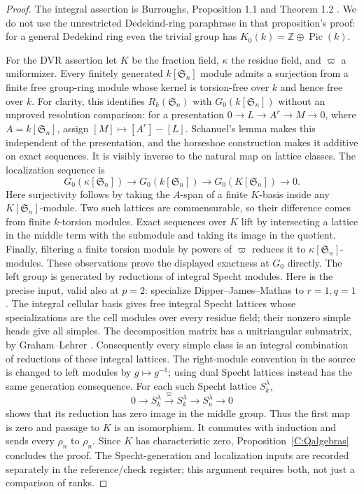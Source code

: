 \begin{proof}
The integral assertion is Burroughs, Proposition 1.1 and Theorem 1.2
\cite{C-Burroughs1974}. We do not use the unrestricted Dedekind-ring paraphrase
in that proposition's proof: for a general Dedekind ring even the trivial
group has $K_0(k)=\mathbb Z\oplus\operatorname{Pic}(k)$.

For the DVR assertion let $K$ be the fraction field, $\kappa$ the residue
field, and $\varpi$ a uniformizer. Every finitely generated $k[\mathfrak S_n]$
module admits a surjection from a finite free group-ring module whose kernel
is torsion-free over $k$ and hence free over $k$. For clarity, this identifies $R_k(\mathfrak S_n)$ with
$G_0(k[\mathfrak S_n])$ without an unproved resolution comparison:
for a presentation $0\to L\to A^r\to M\to0$, where $A=k[\mathfrak S_n]$,
assign $[M]\mapsto[A^r]-[L]$. Schanuel's lemma makes this independent of
the presentation, and the horseshoe construction makes it additive on
exact sequences. It is visibly inverse to the natural map on lattice
classes.
The localization sequence is
\[
 G_0(\kappa[\mathfrak S_n])\longrightarrow
 G_0(k[\mathfrak S_n])\longrightarrow G_0(K[\mathfrak S_n])\longrightarrow0.
\]
Here surjectivity follows by taking the $A$-span of a finite $K$-basis
inside any $K[\mathfrak S_n]$-module. Two such lattices are commensurable,
so their difference comes from finite $k$-torsion modules. Exact sequences
over $K$ lift by intersecting a lattice in the middle term with the submodule
and taking its image in the quotient. Finally, filtering a finite torsion
module by powers of $\varpi$ reduces it to $\kappa[\mathfrak S_n]$-modules.
These observations prove the displayed exactness at $G_0$ directly.
The left group is generated by reductions of integral Specht modules.
Here is the precise input, valid also at $p=2$: specialize
Dipper--James--Mathas \cite[Theorem 3.26, Definition 3.28, Theorem 3.30;
preprint pp.12--13]{C-DipperJamesMathas1998} to $r=1,q=1$.
The integral cellular basis gives free integral Specht lattices whose
specializations are the cell modules over every residue field; their
nonzero simple heads give all simples. The decomposition matrix has a
unitriangular submatrix, by Graham--Lehrer
\cite[Proposition 2.4(i),(ii); author manuscript p.3]{C-GrahamLehrer2004}.
Consequently every simple class is an integral combination of reductions
of these integral lattices. The right-module convention in the source
is changed to left modules by $g\mapsto g^{-1}$; using dual Specht
lattices instead has the same generation consequence. For each such
Specht lattice $S_k^\lambda$,
\[
 0\longrightarrow S_k^\lambda\xrightarrow{\varpi}S_k^\lambda
 \longrightarrow S_\kappa^\lambda\longrightarrow0
\]
shows that its reduction has zero image in the middle group. Thus the first
map is zero and passage to $K$ is an isomorphism. It commutes with induction
and sends every $\rho_n$ to $\rho_n$. Since $K$ has characteristic zero,
Proposition~\ref{C:Qalgebras} concludes the proof.
The Specht-generation and localization inputs are recorded separately in the
reference/check register; this argument requires both, not just a comparison
of ranks.
\end{proof}

